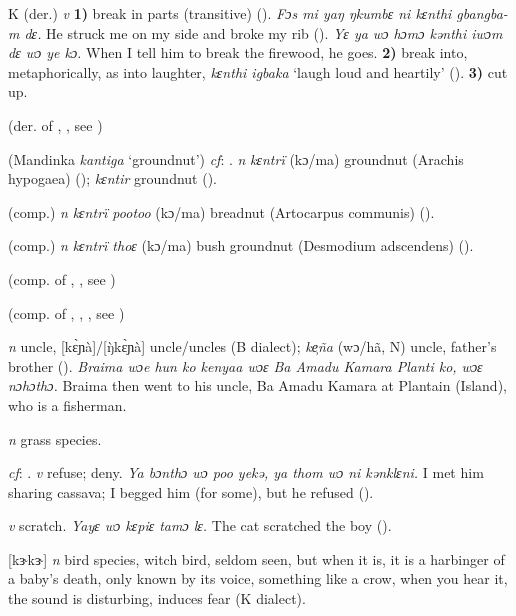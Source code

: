 \begin{letter}{K}
 (der.) \textit{v} \textbf{1)} break in parts (transitive) (\citealt{Sumner1921}). \textit{Fɔs mi yaŋ ŋkumbɛ ni kɛnthi gbangba-m dɛ.} He struck me on my side and broke my rib (\citealt{Pichl1967}). \textit{ Yɛ ya wɔ hɔmɔ kənthi iwɔm dɛ wɔ ye kɔ.} When I tell him to break the firewood, he goes. \textbf{2)} break into, metaphorically, as into laughter, \textit{kɛnthi igbaka} ‘laugh loud and heartily' (\citealt{Pichl1967}). \textbf{3)} cut up.

 (der. of , , see ) 

 (Mandinka \textit{kantiga} ‘groundnut') \textit{cf}: . \textit{n} \textit{kɛntrï} (kɔ/ma) groundnut (Arachis hypogaea) (\citealt{Pichl1967}); \textit{kɛntir} groundnut (\citealt{Sumner1921}). 

 (comp.) \textit{n} \textit{kɛntrï pootoo} (kɔ/ma) breadnut (Artocarpus communis) (\citealt{Pichl1967}). 

 (comp.) \textit{n} \textit{kɛntrï thoɛ} (kɔ/ma) bush groundnut (Desmodium adscendens) (\citealt{Pichl1967}). 

 (comp. of , , see ) 

 (comp. of , , , see ) 

 \textit{n} uncle, [kɛ̀ɲà]/[\`{ŋ}kɛ̀ɲà] uncle/uncles (B dialect); \textit{ke̹ña} (wɔ/hã, N) uncle, father's brother (\citealt{Pichl1967}). \textit{Braima wɔe hun ko kenyaa wɔɛ Ba Amadu Kamara Planti ko, wɔɛ nɔhɔthɔ.} Braima then went to his uncle, Ba Amadu Kamara at Plantain (Island), who is a fisherman.

 \textit{n} grass species.

 \textit{cf}: . \textit{v} refuse; deny. \textit{Ya bɔnthɔ wɔ poo yekə, ya thom wɔ ni kənklɛni.} I met him sharing cassava; I begged him (for some), but he refused (\citealt{Pichl1967}). 

 \textit{v} scratch. \textit{Yayɛ wɔ kɛpiɛ tamɔ lɛ.} The cat scratched the boy (\citealt{Pichl1967}). 

 [kɝkɝ] \textit{n} bird species, witch bird, seldom seen, but when it is, it is a harbinger of a baby's death, only known by its voice, something like a crow, when you hear it, the sound is disturbing, induces fear (K dialect).


\end{letter}
